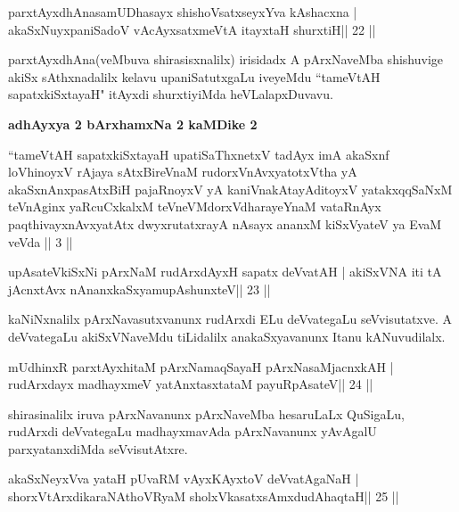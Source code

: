 \begin{shl}
parxtAyxdhAnasamUDhasayx shishoVsatxseyxYva kAshacxna |
akaSxNuyxpaniSadoV vAcAyxsatxmeVtA itayxtaH shurxtiH\hfill || 22 ||
\end{shl}

\begin{artha}
parxtAyxdhAna(veMbuva shirasisxnalilx) irisidadx A pArxNaveMba shishuvige akiSx sAthxnadalilx kelavu upaniSatutxgaLu iveyeMdu ``tameVtAH sapatxkiSxtayaH" itAyxdi shurxtiyiMda heVLalapxDuvavu.
\end{artha}


\centerline{\textbf{adhAyxya 2 bArxhamxNa 2 kaMDike 2}}
\medskip

\begin{shl}
``tameVtAH sapatxkiSxtayaH upatiSaThxnetxV tadAyx imA akaSxnf
  loVhinoyxV rAjaya sAtxBireVnaM rudorxV\s nAvxyatotxV\s tha yA
  akaSxnAnxpasAtxBiH pajaRnoyxV yA kaniVnakAtayA\s ditoyxV
  yatakxqqSaNxM teVnAginx yaRcuCxkalxM teVneVMdorxV\s dharayeYnaM
  vataRnAyx paqthivayxnAvxyatAtx dwyxrutatxrayA nAsayx ananxM
  kiSxVyateV ya EvaM veVda || 3 || 
\end{shl}


\begin{shl}
upAsateV\s kiSxNi pArxNaM rudArxdAyxH sapatx deVvatAH |
akiSxVNA iti tA jAcnxtAvx nAnanxkaSxyamupAshunxteV\hfill || 23 ||
\end{shl}

\begin{artha}
kaNiNxnalilx pArxNavasutxvanunx rudArxdi ELu deVvategaLu seVvisutatxve. A deVvategaLu akiSxVNaveMdu tiLidalilx anakaSxyavanunx Itanu kANuvudilalx.
\end{artha}

\begin{shl}
mUdhinxR parxtAyxhitaM pArxNamaqSayaH pArxNasaMjacnxkAH |
rudArxdayx madhayxmeV yatAnxtasxtataM payuRpAsateV\hfill || 24 ||
\end{shl}

\begin{artha}
shirasinalilx iruva pArxNavanunx pArxNaveMba hesaruLaLx QuSigaLu, rudArxdi deVvategaLu madhayxmavAda pArxNavanunx yAvAgalU parxyatanxdiMda seVvisutAtxre.
\end{artha}

\begin{shl}
akaSxNeyxVva yataH pUvaRM vAyxKAyxtoV deVvatAgaNaH |
shorxVtArxdikaraNAthoVR\s yaM sholxVkasatxsAmxdudAhaqtaH\hfill || 25 ||
\end{shl}

